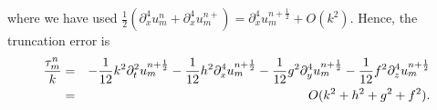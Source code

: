 where we have used $\frac{1}{2}(\partial_x^4 u_m^n + \partial_x^4 u_m^{n+}) = \partial_x^4 u_m^{n+\frac{1}{2}} + O(k^2)$. Hence, the truncation error is 
\begin{eqnarray*}
\frac{\tau_m^ n}{k} &=& -\frac{1}{12} k^2 \partial_t^2 u_m^{n+\frac{1}{2}} - \frac{1}{12} h^2 \partial_x^4 u_m^{n+\frac{1}{2}} - \frac{1}{12} g^2 \partial_y^4 u_m^{n+\frac{1}{2}} - \frac{1}{12} f^2 \partial_z^4 u_m^{n+\frac{1}{2}}\\
&=& O(k^2 + h^2 + g^2 + f^2) \rm{.}
\end{eqnarray*}

